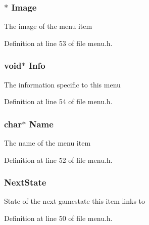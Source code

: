 \subsubsection[{\texorpdfstring{Image}{Image}}]{$\ast$ Image}\hypertarget{structmenu__item__s_a25fe573e4bbeefb06bccb0c0c9acf35f}{}\label{structmenu__item__s_a25fe573e4bbeefb06bccb0c0c9acf35f}
The image of the menu item 

Definition at line 53 of file menu.\+h.

\subsubsection[{\texorpdfstring{Info}{Info}}]{\setlength{\rightskip}{0pt plus 5cm}void$\ast$ Info}\hypertarget{structmenu__item__s_a2459e5f05ca13ac8dff1f7b9abda4534}{}\label{structmenu__item__s_a2459e5f05ca13ac8dff1f7b9abda4534}
The information specific to this menu 

Definition at line 54 of file menu.\+h.

\subsubsection[{\texorpdfstring{Name}{Name}}]{\setlength{\rightskip}{0pt plus 5cm}char$\ast$ Name}\hypertarget{structmenu__item__s_a5e6182c030324511dd82e9fa1a0ab071}{}\label{structmenu__item__s_a5e6182c030324511dd82e9fa1a0ab071}
The name of the menu item 

Definition at line 52 of file menu.\+h.

\subsubsection[{\texorpdfstring{Next\+State}{NextState}}]{ Next\+State}\hypertarget{structmenu__item__s_ab0377c6660ff457af3498a0e121e42f0}{}\label{structmenu__item__s_ab0377c6660ff457af3498a0e121e42f0}
State of the next gamestate this item links to 

Definition at line 50 of file menu.\+h.

